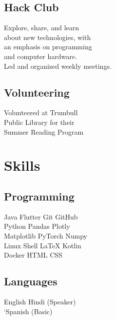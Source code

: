\documentclass[]{resume-template}
\begin{document}
\begin{minipage}[t]{0.33\textwidth}
\subsection{Hack Club}\label{subsec:hack-club}
Explore, share, and learn\\ about
new technologies, with \\
an emphasis on programming\\
and computer hardware.\\ Led and organized weekly meetings.
\vspace{\topsep}

\subsection{Volunteering}\label{subsec:volunteering}
Volunteered at Trumbull \\
Public Library for their\\
Summer Reading Program
\sectionsep{}

\section{Skills}\label{sec:skills}

\subsection{Programming}\label{subsec:programming}
Java \textbullet{} Flutter \textbullet{} Git \textbullet{} GitHub\\
Python \textbullet{} Pandas \textbullet{} Plotly\\
Matplotlib \textbullet{} PyTorch \textbullet Numpy\\
Linux \textbullet{} Shell \textbullet{}  \LaTeX{} \textbullet{} Kotlin\\
Docker \textbullet{}  HTML \textbullet{}  CSS
\sectionsep{}

\subsection{Languages}
English \textbullet{} Hindi (Speaker)\\
`Spanish (Basic)


\end{minipage}
\end{document}
